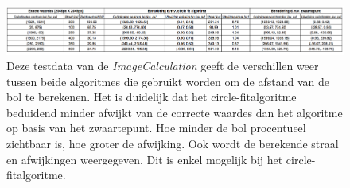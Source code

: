 \begin{figure}[h]
	\centering
	\includegraphics[width=1\textwidth]{TestData.png}
	\caption{Deze testdata van de \textit{ImageCalculation} geeft de verschillen weer tussen beide algoritmes die gebruikt worden om de afstand van de bol te berekenen. Het is duidelijk dat het circle-fitalgoritme beduidend minder afwijkt van de correcte waardes dan het algoritme op basis van het zwaartepunt. Hoe minder de bol procentueel zichtbaar is, hoe groter de afwijking. Ook wordt de berekende straal en afwijkingen weergegeven. Dit is enkel mogelijk bij het circle-fitalgoritme. }
\end{figure}